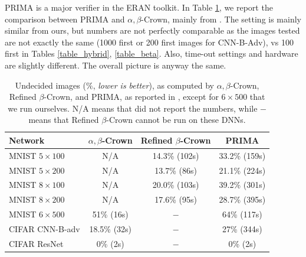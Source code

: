 PRIMA \cite{prima} is a major verifier in the ERAN toolkit. In Table \ref{table9}, we report the comparison between PRIMA and $\alpha,\beta$-Crown, mainly from \cite{crown}. The setting is mainly similar from ours, but numbers are not perfectly comparable as the images tested are not  exactly the same (1000 first or 200 first images for CNN-B-Adv), vs 100 first in Tables \ref{table_hybrid}, \ref{table_beta}. Also, time-out settings and hardware are slightly different. The overall picture is anyway the same.

\begin{table}[h!]
	\centering
	\begin{tabular}{||l||c|c||c||}
		\hline \hline
		Network & $\alpha,\beta$-Crown & Refined $\beta$-Crown & PRIMA \\ 		  
		\hline
		MNIST $5 \times 100$ & N/A  & 14.3\% (102s) & 33.2\% (159s)\\ \hline
		MNIST $5 \times 200$ & N/A & 13.7\% (86s) & 21.1\% (224s) \\ \hline
		MNIST $8 \times 100$ & N/A  & 20.0\% (103s) & 39.2\% (301s)   \\ \hline
		MNIST $8 \times 200$ & N/A & 17.6\% (95s) & 28.7\% (395s)  \\ \hline
		MNIST $6 \times 500$ & 51\% (16s) & $-$ & 64\% (117s) \\ \hline
		CIFAR CNN-B-adv & 18.5\% (32s) & $-$ & 27\% (344s)\\ \hline \hline
		CIFAR ResNet & 0\% (2s) & $-$ & 0\% (2s) \\ \hline \hline
	\end{tabular}
	\caption{Undecided images ($\%$, {\em lower is better}), as computed by $\alpha,\beta$-Crown, Refined $\beta$-Crown, and PRIMA, as reported in \cite{crown}, except for $6 \times 500$ that we run ourselves. N/A means that \cite{crown} did not report the numbers, while $-$ means that Refined $\beta$-Crown cannot be run on these DNNs.}
	\label{table9}
	\end{table}

